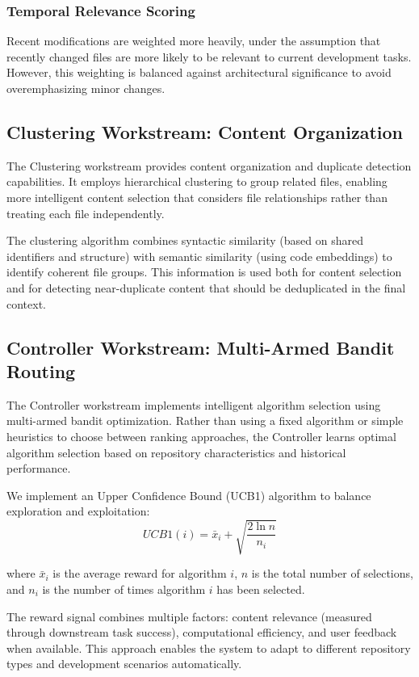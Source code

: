 \documentclass[conference]{IEEEtran}
\begin{document}
\subsubsection{Temporal Relevance Scoring}
Recent modifications are weighted more heavily, under the assumption that recently changed files are more likely to be relevant to current development tasks. However, this weighting is balanced against architectural significance to avoid overemphasizing minor changes.

\subsection{Clustering Workstream: Content Organization}

The Clustering workstream provides content organization and duplicate detection capabilities. It employs hierarchical clustering to group related files, enabling more intelligent content selection that considers file relationships rather than treating each file independently.

The clustering algorithm combines syntactic similarity (based on shared identifiers and structure) with semantic similarity (using code embeddings) to identify coherent file groups. This information is used both for content selection and for detecting near-duplicate content that should be deduplicated in the final context.

\subsection{Controller Workstream: Multi-Armed Bandit Routing}

The Controller workstream implements intelligent algorithm selection using multi-armed bandit optimization. Rather than using a fixed algorithm or simple heuristics to choose between ranking approaches, the Controller learns optimal algorithm selection based on repository characteristics and historical performance.

We implement an Upper Confidence Bound (UCB1) algorithm to balance exploration and exploitation:
\begin{equation}
UCB1(i) = \bar{x}_i + \sqrt{\frac{2 \ln n}{n_i}}
\end{equation}

where $\bar{x}_i$ is the average reward for algorithm $i$, $n$ is the total number of selections, and $n_i$ is the number of times algorithm $i$ has been selected.

The reward signal combines multiple factors: content relevance (measured through downstream task success), computational efficiency, and user feedback when available. This approach enables the system to adapt to different repository types and development scenarios automatically.
\end{document}
